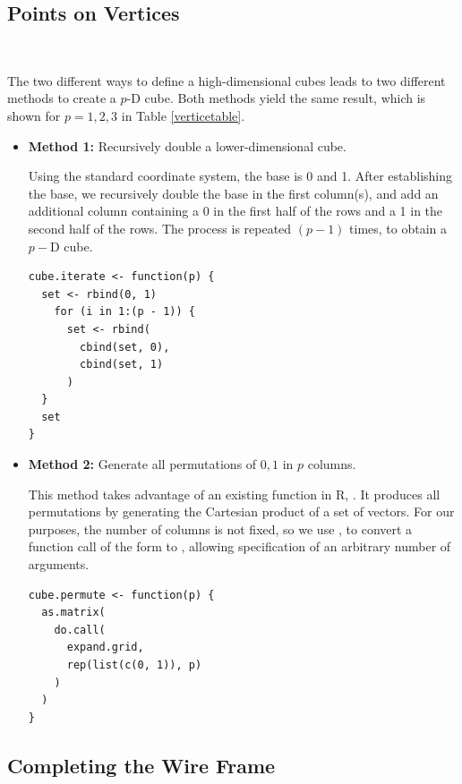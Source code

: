 \subsection{Points on Vertices}~\label{cube-vertices}

The two different ways to define a high-dimensional cubes leads to two
different methods to create a $p$-D cube. Both methods yield the same
result, which is shown for $p=1,2,3$ in Table \ref{verticetable}.

\begin{itemize}

  \item {\bf Method 1:} Recursively double a lower-dimensional cube.

    Using the standard coordinate system, the base is 0 and 1. After
    establishing the base, we recursively double the base in the first
    column(s), and add an additional column containing a 0 in the
    first half of the rows and a 1 in the second half of the rows. The
    process is repeated $(p-1)$ times, to obtain a $p-$D cube.

\begin{verbatim}
cube.iterate <- function(p) {
  set <- rbind(0, 1)
    for (i in 1:(p - 1)) {
      set <- rbind(
        cbind(set, 0),
        cbind(set, 1)
      )
  }
  set
}
\end{verbatim}

  \item {\bf Method 2:} Generate all permutations of ${0, 1}$ in $p$ columns.

    This method takes advantage of an existing function in R,
    . It produces all permutations by generating the
    Cartesian product of a set of vectors. For our purposes, the
    number of columns is not fixed, so we use , to
    convert a function call of the form  to
    , allowing specification of an
    arbitrary number of arguments.

  \begin{verbatim}
cube.permute <- function(p) {
  as.matrix(
    do.call(
      expand.grid,
      rep(list(c(0, 1)), p)
    )
  )
}
\end{verbatim}
\end{itemize}

\subsection{Completing the Wire Frame}

